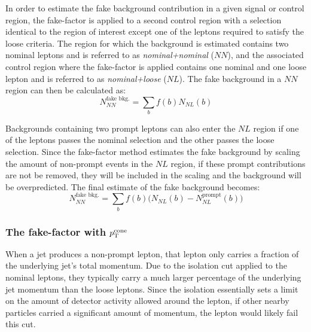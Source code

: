 In order to estimate the fake background contribution in a given signal or control region, the fake-factor is applied to a second control region with a selection identical to the region of interest except one of the leptons required to satisfy the loose criteria.
The region for which the background is estimated contains two nominal leptons and is referred to as \emph{nominal+nominal} ($NN$), and the associated control region where the fake-factor is applied contains one nominal and one loose lepton and is referred to as \emph{nominal+loose} ($NL$).
The fake background in a $NN$ region can then be calculated as:
\begin{equation}
N_{NN}^{\textrm{fake\ bkg.}} = \sum\limits_{b}f(b) N_{NL}(b)
\label{eq:ssww13tev_ff_bkg_nosub}
\end{equation}

Backgrounds containing two prompt leptons can also enter the $NL$ region if one of the leptons passes the nominal selection and the other passes the loose selection.
Since the fake-factor method estimates the fake background by scaling the amount of non-prompt events in the $NL$ region, if these prompt contributions are not be removed, they will be included in the scaling and the background will be overpredicted.
The final estimate of the fake background becomes:
\begin{equation}
N_{NN}^{\textrm{fake\ bkg.}} = \sum\limits_{b}f(b) \big(N_{NL}(b) - N_{NL}^{\textrm{prompt}}(b)\big)
\label{eq:ssww13tev_ff_bkg}
\end{equation}

%
\subsubsection{The fake-factor with $p_{\mathrm{T}}^{\textrm{cone}}$}\label{ssww13tev:ff_method_ptcone}
When a jet produces a non-prompt lepton, that lepton only carries a fraction of the underlying jet's total momentum.
Due to the isolation cut applied to the nominal leptons, they typically carry a much larger percentage of the underlying jet momentum than the loose leptons. %
Since the isolation essentially sets a limit on the amount of detector activity allowed around the lepton, if other nearby particles carried a significant amount of momentum, the lepton would likely fail this cut.

